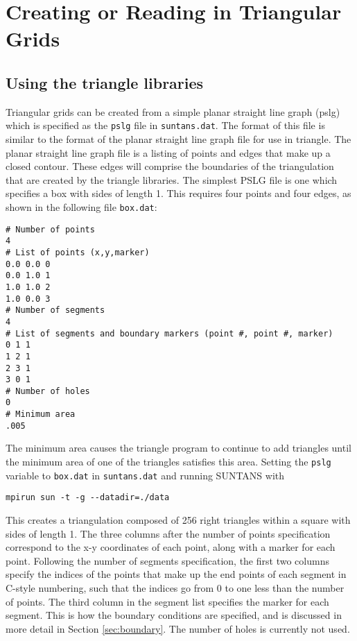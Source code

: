 \section{Creating or Reading in Triangular Grids} \label{sec:grids}

\subsection{Using the triangle libraries} \label{sec:tri}

Triangular grids can be created from a simple planar straight line
graph (pslg) which is specified as the \verb+pslg+ file in \verb+suntans.dat+.
The format of this file is similar to the format of the planar straight
line graph file for use in triangle.  The planar straight line graph
file is a listing of points and edges that make up a closed contour.
These edges will comprise the boundaries of the triangulation that are
created by the triangle libraries.  The simplest PSLG file is one which
specifies a box with sides of length 1.  This requires four points and
four edges, as shown in the following file \verb+box.dat+:
\begin{verbatim}
# Number of points
4
# List of points (x,y,marker)
0.0 0.0 0
0.0 1.0 1
1.0 1.0 2
1.0 0.0 3
# Number of segments
4
# List of segments and boundary markers (point #, point #, marker)
0 1 1
1 2 1
2 3 1
3 0 1
# Number of holes
0
# Minimum area
.005
\end{verbatim}
The minimum area causes the triangle program to continue to add triangles
until the minimum area of one of the triangles satisfies this area.  
Setting the \verb+pslg+ variable to \verb+box.dat+ in \verb+suntans.dat+
and running SUNTANS with
\begin{verbatim}
mpirun sun -t -g --datadir=./data
\end{verbatim}
This creates a triangulation composed of 256 right triangles within a square
with sides of length 1.  The three columns after the number of points
specification correspond to the x-y coordinates of each point, along
with a marker for each point.  Following the number of segments specification,
the first two columns specify the indices of the points that make up
the end points of each segment in C-style numbering, such that the indices
go from 0 to one less than the number of points.  The third column in the
segment list specifies the marker for each segment.  This is how the boundary
conditions are specified, and is discussed in more detail in Section \ref{sec:boundary}.
The number of holes is currently not used.

